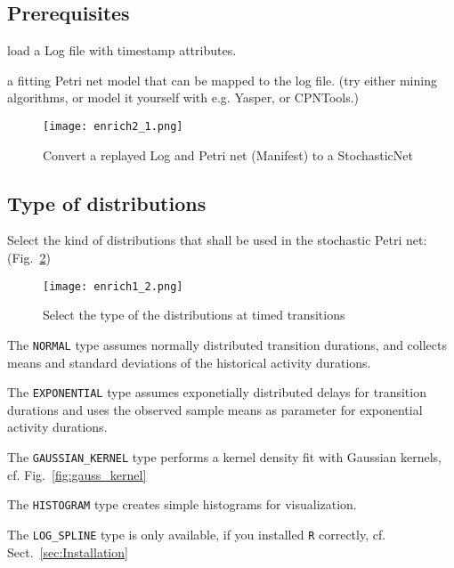 \subsection*{Prerequisites}
\begin{compactitem}
  \item load a Log file with timestamp attributes.
  \item a fitting Petri net model that can be mapped to the log file.
  (try either mining algorithms, or model it yourself with e.g. Yasper, or CPNTools.)  
\end{compactitem} 

\begin{figure}[H]
\texttt{[image: enrich2\_1.png]}
\caption{Convert a replayed Log and Petri net (Manifest) to a StochasticNet}
\label{fig:convert_manifest}
\end{figure}

\subsection*{Type of distributions}
Select the kind of distributions that shall be used in the stochastic Petri net: (Fig.~\ref{fig:distribution_type_selection})
\begin{figure}[h]
\centering
\texttt{[image: enrich1\_2.png]}
\caption{Select the type of the distributions at timed transitions}
\label{fig:distribution_type_selection}
\end{figure}

\begin{compactitem}
  \item The \texttt{NORMAL} type assumes normally distributed transition durations, and collects means and standard deviations of the historical activity durations.
  \item The \texttt{EXPONENTIAL} type assumes exponetially distributed delays for transition durations and uses the observed sample means as parameter for exponential activity durations.
  \item The \texttt{GAUSSIAN\_KERNEL} type performs a kernel density fit with Gaussian kernels, cf. Fig.~\ref{fig:gauss_kernel}
  \item The \texttt{HISTOGRAM} type creates simple histograms for visualization.
  \item The \texttt{LOG\_SPLINE} type is only available, if you installed \texttt{R} correctly, cf. Sect.~\ref{sec:Installation}
\end{compactitem} 

